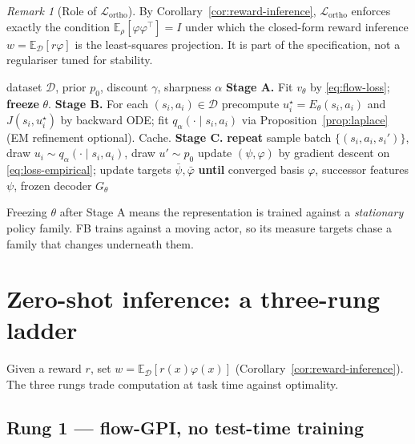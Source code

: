 \documentclass[11pt]{article}
\theoremstyle{plain}
\theoremstyle{definition}
\theoremstyle{remark}
\newtheorem{remark}[lemma]{Remark}
\newcommand{\D}{\mathcal D}
\newcommand{\E}{\mathbb E}
\newcommand{\1}{\mathbf 1}
\newcommand{\Gth}{G_\theta}
\newcommand{\Eth}{E_\theta}
\begin{document}
\begin{remark}[Role of $\mathcal L_{\mathrm{ortho}}$]
By Corollary~\ref{cor:reward-inference}, $\mathcal L_{\mathrm{ortho}}$ enforces exactly the
condition $\E_\rho[\varphi\varphi^\top]=I$ under which the closed-form reward inference
$w=\E_\D[r\varphi]$ is the least-squares projection. It is part of the specification, not a
regulariser tuned for stability.
\end{remark}

\begin{algorithm}[t]
\caption{PSMFlows pretraining (reward-free)}
\label{alg:pretrain}
\begin{algorithmic}[1]
\Require dataset $\D$, prior $p_0$, discount $\gamma$, sharpness $\alpha$
\State \textbf{Stage A.} Fit $v_\theta$ by \eqref{eq:flow-loss}; \textbf{freeze} $\theta$.
\State \textbf{Stage B.} For each $(s_i,a_i)\in\D$ precompute $u^\star_i=\Eth(s_i,a_i)$ and
       $J(s_i,u^\star_i)$ by backward ODE; fit $q_\alpha(\cdot\mid s_i,a_i)$ via
       Proposition~\ref{prop:laplace} (EM refinement optional). Cache.
\State \textbf{Stage C.} \textbf{repeat}
\State \quad sample batch $\{(s_i,a_i,s_i')\}$, draw $u_i\sim q_\alpha(\cdot\mid s_i,a_i)$,
       draw $u'\sim p_0$
\State \quad update $(\psi,\varphi)$ by gradient descent on \eqref{eq:loss-empirical};
       update targets $\bar\psi,\bar\varphi$
\State \textbf{until} converged
\Ensure basis $\varphi$, successor features $\psi$, frozen decoder $\Gth$
\end{algorithmic}
\end{algorithm}

\noindent
Freezing $\theta$ after Stage A means the representation is trained against a
\emph{stationary} policy family. FB trains against a moving actor, so its measure targets
chase a family that changes underneath them.

\section{Zero-shot inference: a three-rung ladder}
\label{sec:inference}

Given a reward $r$, set $w=\E_\D[r(x)\varphi(x)]$ (Corollary~\ref{cor:reward-inference}).
The three rungs trade computation at task time against optimality.

\subsection{Rung 1 --- flow-GPI, no test-time training}
\end{document}
